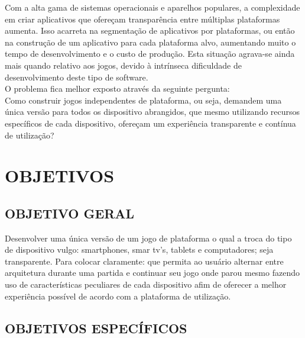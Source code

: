 \documentclass{article}
\begin{document}
Com a alta gama de sistemas operacionais e aparelhos populares, a complexidade em criar aplicativos que ofereçam transparência entre múltiplas plataformas aumenta. Isso acarreta na segmentação de aplicativos por plataformas, ou então na construção de um aplicativo para cada plataforma alvo, aumentando muito o tempo de desenvolvimento e o custo de produção. Esta situação agrava-se ainda mais quando relativo aos jogos, devido à intrínseca dificuldade de desenvolvimento deste tipo de software.
\\
O problema fica melhor exposto através da seguinte pergunta:
\\
	Como construir jogos independentes de plataforma, ou seja, demandem uma única versão para todos os dispositivo abrangidos, que mesmo utilizando recursos específicos de cada dispositivo, ofereçam um experiência transparente e contínua de utilização?
\section{OBJETIVOS}
\subsection{OBJETIVO GERAL}

Desenvolver uma única versão de um jogo de plataforma o qual a troca do tipo de dispositivo vulgo: smartphones, smar tv's, tablets e computadores; seja transparente. Para colocar claramente: que  permita ao usuário alternar entre arquitetura durante uma partida e continuar seu jogo onde parou mesmo fazendo uso de características peculiares de cada dispositivo afim de oferecer a melhor experiência possível de acordo com a plataforma de utilização.

\subsection{OBJETIVOS ESPECÍFICOS}
\end{document}
